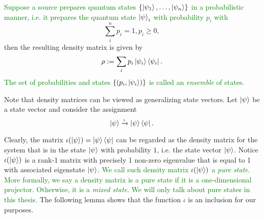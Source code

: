 \begin{definition}
\textcolor{green}{Suppose a source prepares quantum states $\{\ket{\psi_1},\hdots,\ket{\psi_n}\}$ in a probabilistic manner, i.e. it prepares the quantum state $\ket{\psi}_i$ with probability $p_i$ with}
 \begin{equation}
\sum\limits_i^n p_i=1, p_i \geq 0,
\end{equation}
then the resulting density matrix is given by
\begin{equation}
    \rho:=\sum_i p_i \ket{\psi_i}\bra{\psi_i}.
\end{equation}
\textcolor{green}{The set of probabilities and states $\{(p_i, \ket{\psi_i})\}$ is called an \textit{ensemble} of states.}
\end{definition}
\bigskip

Note that density matrices can be viewed as generalizing state vectors.  Let $\ket{\psi}$ be a state vector and consider the assignment
$$\ket{\psi} \xrightarrow{\iota} \ket{\psi}\bra{\psi}.$$

Clearly, the matrix $\iota(\ket{\psi})=\ket{\psi}\bra{\psi}$ can be regarded as the density matrix for the system that is in the state $\ket{\psi}$ with probability $1$, i.e. the state vector $\ket{\psi}$. Notice $\iota({\ket{\psi}})$ is a rank-1 matrix with precisely 1 non-zero eigenvalue that is equal to 1 with associated eigenstate $\ket{\psi}$.
\textcolor{green}{We call such density matrix $\iota(\ket{\psi})$ a \textit{pure state}. More formally, we say a density matrix is a pure state if it is a one-dimensional projector. Otherwise, it is a \textit{mixed state}. We will only talk about pure states in this thesis.}
The following lemma shows that the function $\iota$ is an inclusion for our purposes.

